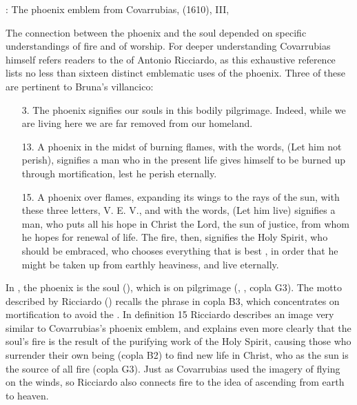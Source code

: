 {: The phoenix emblem from Covarrubias,
 (1610),  III, }

The connection between the phoenix and the soul depended on specific
understandings of fire and of worship.
For deeper understanding Covarrubias himself refers readers to the
 of Antonio Ricciardo, as this exhaustive
reference lists no less than sixteen distinct emblematic uses of the phoenix.
Three of these are pertinent to Bruna's villancico:
\begin{quoting}
    \begin{enumerate}
        \item[3.] The phoenix signifies our souls in this bodily pilgrimage.  
            Indeed, while we are living here we are far removed from our
            homeland.
        \item[13.] A phoenix in the midst of burning flames, with the words,
             (Let him not perish), signifies a man who in the
            present life gives himself to be burned up through 
            mortification, lest he perish eternally.
        \item[15.] A phoenix over flames, expanding its wings to the rays of
            the sun, with these three letters, V. E. V., and with the words,
             (Let him live) \Dots{} signifies a man, who puts
            all his hope in Christ the Lord, the sun of justice, from whom he
            hopes for renewal of life.  
            The fire, then, signifies the Holy Spirit, who should be embraced,
            who chooses everything that is best , in order
            that he might be taken up from earthly heaviness, and live
            eternally.%
                \Autocite[, 132--133]
                {Ricciardo:CommentariaSymbolica}
    \end{enumerate}
\end{quoting}
In , the phoenix is the soul (), which is
on pilgrimage (, , copla G3).
The motto  described by Ricciardo () recalls
the phrase  in copla B3, which concentrates on
mortification to avoid the .
In definition 15 Ricciardo describes an image very similar to Covarrubias's
phoenix emblem, and explains even more clearly that the soul's fire is the
result of the purifying work of the Holy Spirit, causing those who surrender
their own being (copla B2) to find new life in Christ, who as the sun is the
source of all fire (copla G3).
Just as Covarrubias used the imagery of flying on the winds, so Ricciardo also
connects fire to the idea of ascending from earth to heaven.

